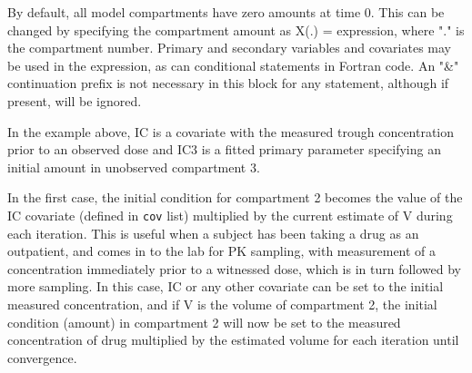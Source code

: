 \documentclass[
]{book}
\newenvironment{Shaded}{\begin{snugshade}}{\end{snugshade}}
\newcommand{\AttributeTok}[1]{\textcolor[rgb]{0.77,0.63,0.00}{#1}}
\newcommand{\DecValTok}[1]{\textcolor[rgb]{0.00,0.00,0.81}{#1}}
\newcommand{\FunctionTok}[1]{\textcolor[rgb]{0.00,0.00,0.00}{#1}}
\newcommand{\NormalTok}[1]{#1}
\newcommand{\OtherTok}[1]{\textcolor[rgb]{0.56,0.35,0.01}{#1}}
\newcommand{\SpecialCharTok}[1]{\textcolor[rgb]{0.00,0.00,0.00}{#1}}
\newcommand{\StringTok}[1]{\textcolor[rgb]{0.31,0.60,0.02}{#1}}
\begin{document}
By default, all model compartments have zero amounts at time 0. This can be changed by specifying the compartment amount as X(.) = expression, where "." is the compartment number. Primary and secondary variables and covariates may be used in the expression, as can conditional statements in Fortran code. An "\&" continuation prefix is not necessary in this block for any statement, although if present, will be ignored.

\begin{Shaded}
\end{Shaded}

In the example above, IC is a covariate with the measured trough
concentration prior to an observed dose and IC3 is a fitted primary parameter specifying an initial amount in unobserved compartment 3.

In the first case, the initial condition for compartment 2 becomes the
value of the IC covariate (defined in \texttt{cov} list) multiplied by
the current estimate of V during each iteration. This is useful when a
subject has been taking a drug as an outpatient, and comes in to the lab for PK sampling, with measurement of a concentration immediately prior to a witnessed dose, which is in turn followed by more sampling. In this case, IC or any other covariate can be set to the initial measured concentration, and if V is the volume of compartment 2, the initial condition (amount) in compartment 2 will now be set to the measured concentration of drug multiplied by the estimated volume for each iteration until convergence.
\end{document}

